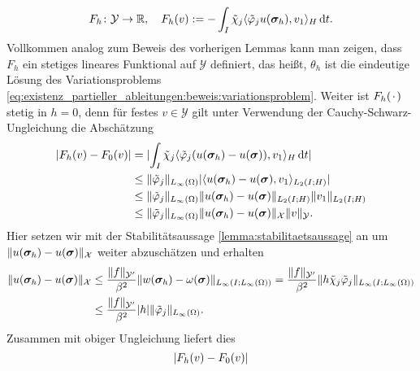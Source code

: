 \begin{Satz}
\begin{Beweis}
\begin{equation}
            F_{h} \colon \mathcal Y \to \mathbb{R}, \quad F_{h}(v) := - \int_{I} \tilde{\chi}_{j} \langle\tilde{\varphi}_{j}  u(\bm\sigma_{h}),v_{1}\rangle_{H} \mathop{}\!\mathrm{d} t.
        \end{equation}
        Vollkommen analog zum Beweis des vorherigen Lemmas kann man zeigen, dass $F_{h}$ ein stetiges lineares Funktional auf $\mathcal Y$ definiert, das heißt, $\theta_{h}$ ist die eindeutige Lösung des Variationsproblems \cref{eq:existenz_partieller_ableitungen:beweis:variationsproblem}.
        Weiter ist $F_{h}({\mkern2mu\cdot\mkern2mu})$ stetig in $h = 0$, denn für festes $v \in \mathcal Y$ gilt unter Verwendung der Cauchy-Schwarz-Ungleichung die Abschätzung
        \begin{align}
            \lvert F_{h}(v) - F_{0}(v)\rvert
            &= \lvert\int_{I} \tilde{\chi}_{j} \langle\tilde{\varphi}_{j}  (u(\bm\sigma_{h}) - u(\bm\sigma)),v_{1}\rangle_{H} \mathop{}\!\mathrm{d} t \rvert
            \\&\leq \lVert\tilde{\varphi}_{j}\rVert_{L_{\infty}(\Omega)} \lvert\langle u(\bm\sigma_{h}) - u(\bm\sigma),v_{1}\rangle_{L_{2}(I; H)} \rvert
            \\&\leq \lVert\tilde{\varphi}_{j}\rVert_{L_{\infty}(\Omega)} \lVert u(\bm\sigma_{h}) - u(\bm\sigma)\rVert_{L_{2}(I; H)} \lVert v_{1}\rVert_{L_{2}(I; H)}
            \\&\leq \lVert\tilde{\varphi}_{j}\rVert_{L_{\infty}(\Omega)} \lVert u(\bm\sigma_{h}) - u(\bm\sigma)\rVert_{\mathcal X} \lVert v\rVert_{\mathcal Y}.
        \end{align}
        Hier setzen wir mit der Stabilitätsaussage \cref{lemma:stabilitaetsaussage} an um $\lVert u(\bm\sigma_{h}) - u(\bm\sigma)\rVert_{\mathcal X}$ weiter abzuschätzen und erhalten
        \begin{equation}
            \begin{aligned}
                \lVert u(\bm\sigma_{h}) - u(\bm\sigma)\rVert_{\mathcal X}
                &\leq \frac{\lVert f\rVert_{\mathcal Y'}}{\beta^{2}} \lVert w(\bm\sigma_{h}) - \omega(\bm\sigma)\rVert_{L_{\infty}(I; L_{\infty}(\Omega))}
                = \frac{\lVert f\rVert_{\mathcal Y'}}{\beta^{2}} \lVert h \tilde{\chi}_{j} \tilde{\varphi}_{j} \rVert_{L_{\infty}(I; L_{\infty}(\Omega))}
                \\&\leq \frac{\lVert f\rVert_{\mathcal Y'}}{\beta^{2}} \lvert h\rvert \lVert\tilde{\varphi}_{j}\rVert_{L_{\infty}(\Omega)}.
            \end{aligned}
        \end{equation}
        Zusammen mit obiger Ungleichung liefert dies
        \begin{equation}
            \abs{F_{h}(v) - F_{0}(v)}

\end{equation}
\end{Beweis}
\end{Satz}
